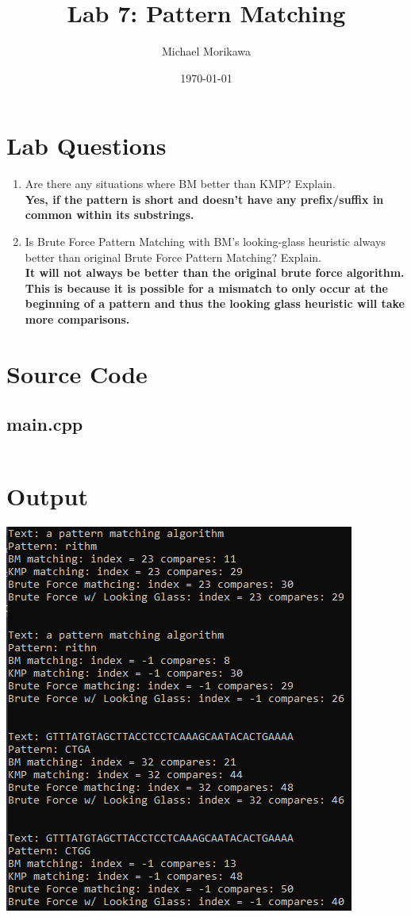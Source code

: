\documentclass{article}
\title{Lab 7: Pattern Matching}
\author{Michael Morikawa}
\date{\today}
\begin{document}
\maketitle
\section{Lab Questions}
\begin{enumerate}[label=\textbf{Question \arabic*}]
    \item Are there any situations where BM better than KMP? Explain.\\
          \textbf{
              Yes, if the pattern is short and doesn't have any prefix/suffix in common within its substrings.
          }
    \item  Is Brute Force Pattern Matching with BM’s looking-glass heuristic
          always better than original Brute Force Pattern Matching? Explain.\\
          \textbf{
              It will not always be better than the original brute force algorithm. This is because it is possible for a mismatch to only occur at the
              beginning of a pattern and thus the looking glass heuristic will take more comparisons.
          }


\end{enumerate}

\section{Source Code}

\subsection{main.cpp}
\inputminted{c++}{../src/main.cpp}

\section{Output}
\includegraphics[]{output.png}
\end{document}
